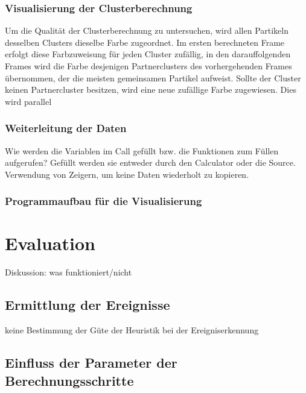 \subsection{Visualisierung der Clusterberechnung}

Um die Qualität der Clusterberechnung zu untersuchen, wird allen Partikeln desselben Clusters dieselbe Farbe zugeordnet. Im ersten berechneten Frame erfolgt diese Farbzuweisung für jeden Cluster zufällig, in den darauffolgenden Frames wird die Farbe desjenigen Partnerclusters des vorhergehenden Frames übernommen, der die meisten gemeinsamen Partikel aufweist. Sollte der Cluster keinen Partnercluster besitzen, wird eine neue zufällige Farbe zugewiesen. Dies wird parallel


\subsection{Weiterleitung der Daten}

Wie werden die Variablen im Call gefüllt bzw. die Funktionen zum Füllen aufgerufen? Gefüllt werden sie entweder durch den Calculator oder die Source. Verwendung von Zeigern, um keine Daten wiederholt zu kopieren.

\subsection{Programmaufbau für die Visualisierung}


\chapter{Evaluation}

Diskussion: was funktioniert/nicht

\section{Ermittlung der Ereignisse}

keine Bestimmung der Güte der Heuristik bei der Ereigniserkennung


\section{Einfluss der Parameter der Berechnungsschritte}

